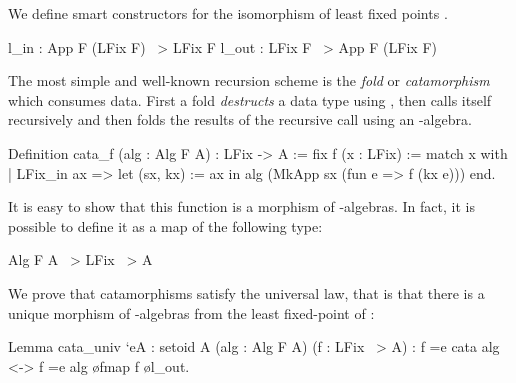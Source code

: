 \documentclass[anonymous, a4paper, UKenglish, cleveref, autoref, thm-restate]{lipics-v2021}
\newcommand{\dcas}[1]{\textcolor{ForestGreen}{\textsc{David}: #1}}
\newcommand{\cata}[1]{\lbans #1 \rbans}
\newcommand{\ana}[1]{\llens #1 \rlens}
\newcommand{\operator}[1]{\textsf{#1}}
\newcommand{\InOp}{\operator{in}^{\circ}}
\newcommand{\OutOp}{\operator{out}^{\circ}}
\begin{document}


We define smart constructors for the isomorphism of least fixed points
.
\begin{coqcode}
l_in : App F (LFix F) ~> LFix F
l_out : LFix F ~> App F (LFix F)
\end{coqcode}

The most simple and well-known recursion scheme is the \emph{fold} or
\emph{catamorphism} which consumes data. First a fold \emph{destructs} a data
type using , then calls itself recursively and then folds the
results of the recursive call using an -algebra.
\begin{coqcode}
Definition cata_f (alg : Alg F A) : LFix -> A
:= fix f (x : LFix) :=
  match x with
  | LFix_in ax =>
      let (sx, kx) := ax in
      alg (MkApp sx (fun e => f (kx e)))
  end.
\end{coqcode}
It is easy to show that this function is a morphism of -algebras. In fact,
it is possible to define it as a map of the following type:
\begin{coqcode}
Alg F A ~> LFix ~> A
\end{coqcode}

We prove that catamorphisms satisfy the universal law, that is that there is a
unique morphism of -algebras from the least fixed-point of :
\begin{coqcode}
Lemma cata_univ `{eA : setoid A} (alg : Alg F A) (f : LFix ~> A)
    : f =e cata alg <-> f =e alg \o fmap f \o l_out.
\end{coqcode}
\end{document}
